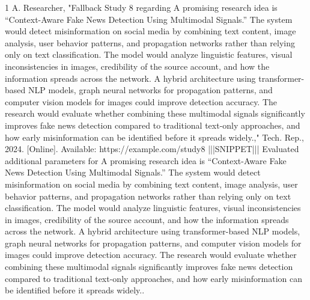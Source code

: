 \documentclass[conference]{IEEEtran}
\begin{document}
\begin{thebibliography}{1}
A. Researcher, "Fallback Study 8 regarding A promising research idea is “Context-Aware Fake News Detection Using Multimodal Signals.” The system would detect misinformation on social media by combining text content, image analysis, user behavior patterns, and propagation networks rather than relying only on text classification. The model would analyze linguistic features, visual inconsistencies in images, credibility of the source account, and how the information spreads across the network. A hybrid architecture using transformer-based NLP models, graph neural networks for propagation patterns, and computer vision models for images could improve detection accuracy. The research would evaluate whether combining these multimodal signals significantly improves fake news detection compared to traditional text-only approaches, and how early misinformation can be identified before it spreads widely.," Tech. Rep., 2024. [Online]. Available: https://example.com/study8 |||SNIPPET||| Evaluated additional parameters for A promising research idea is “Context-Aware Fake News Detection Using Multimodal Signals.” The system would detect misinformation on social media by combining text content, image analysis, user behavior patterns, and propagation networks rather than relying only on text classification. The model would analyze linguistic features, visual inconsistencies in images, credibility of the source account, and how the information spreads across the network. A hybrid architecture using transformer-based NLP models, graph neural networks for propagation patterns, and computer vision models for images could improve detection accuracy. The research would evaluate whether combining these multimodal signals significantly improves fake news detection compared to traditional text-only approaches, and how early misinformation can be identified before it spreads widely..

\end{thebibliography}
\end{document}
